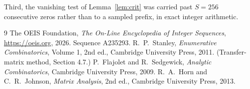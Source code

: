 \documentclass[11pt,a4paper]{article}
\theoremstyle{plain}
\theoremstyle{definition}
\begin{document}
Third, the vanishing test of Lemma~\ref{lem:crit} was carried past $S=256$ consecutive
zeros rather than to a sampled prefix, in exact integer arithmetic.

\begin{thebibliography}{9}
 The OEIS Foundation, \emph{The On-Line Encyclopedia of Integer
Sequences}, \url{https://oeis.org}, 2026. Sequence A235293.
 R.~P.~Stanley, \emph{Enumerative Combinatorics}, Volume 1, 2nd ed.,
Cambridge University Press, 2011. (Transfer-matrix method, Section 4.7.)
 P.~Flajolet and R.~Sedgewick, \emph{Analytic Combinatorics}, Cambridge
University Press, 2009.
 R.~A.~Horn and C.~R.~Johnson, \emph{Matrix Analysis}, 2nd ed., Cambridge
University Press, 2013.
\end{thebibliography}
\end{document}
